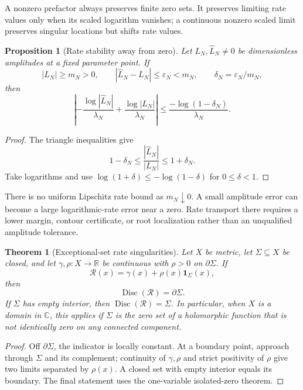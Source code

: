 \documentclass[11pt,a4paper]{article}
\theoremstyle{definition}
\theoremstyle{plain}
\newtheorem{proposition}[definition]{Proposition}
\newtheorem{theorem}[definition]{Theorem}
\theoremstyle{remark}
\begin{document}
A nonzero prefactor always preserves finite zero sets.  It preserves limiting
rate values only when its scaled logarithm vanishes; a continuous nonzero
scaled limit preserves singular locations but shifts rate values.

\begin{proposition}[Rate stability away from zero]\label{prop:ratestability}
Let \(L_N,\widehat L_N\ne0\) be dimensionless amplitudes at a fixed parameter
point.  If
\[
 |L_N|\geq m_N>0,\qquad
 |\widehat L_N-L_N|\leq\varepsilon_N<m_N,
 \qquad \delta_N=\varepsilon_N/m_N,
\]
then
\[
 \left|
 -\frac{\log|\widehat L_N|}{\lambda_N}
 +\frac{\log|L_N|}{\lambda_N}
 \right|
 \leq
 \frac{-\log(1-\delta_N)}{\lambda_N}.
\]
\end{proposition}
\begin{proof}
The triangle inequalities give
\[
 1-\delta_N
 \leq\frac{|\widehat L_N|}{|L_N|}
 \leq1+\delta_N.
\]
Take logarithms and use
\(\log(1+\delta)\leq-\log(1-\delta)\) for \(0\leq\delta<1\).
\end{proof}

There is no uniform Lipschitz rate bound as \(m_N\downarrow0\).  A small
amplitude error can become a large logarithmic-rate error near a zero.
Rate transport there requires a lower margin, contour certificate, or root
localization rather than an unqualified amplitude tolerance.

\begin{theorem}[Exceptional-set rate singularities]\label{thm:ratesupport}
Let \(X\) be metric, let \(\Sigma\subseteq X\) be closed, and let
\(\gamma,\rho:X\to\mathbb R\) be continuous with
\(\rho>0\) on \(\partial\Sigma\).  If
\[
 \mathcal R(x)=\gamma(x)+\rho(x)\mathbf1_\Sigma(x),
\]
then
\[
 \operatorname{Disc}(\mathcal R)=\partial\Sigma.
\]
If \(\Sigma\) has empty interior, then
\(\operatorname{Disc}(\mathcal R)=\Sigma\).  In particular, when \(X\) is a
domain in \(\mathbb C\), this applies if \(\Sigma\) is the zero set of a
holomorphic function that is not identically zero on any connected component.
\end{theorem}
\begin{proof}
Off \(\partial\Sigma\), the indicator is locally constant.  At a boundary
point, approach through \(\Sigma\) and its complement; continuity of
\(\gamma,\rho\) and strict positivity of \(\rho\) give two limits separated
by \(\rho(x)\).  A closed set with empty interior equals its boundary.  The
final statement uses the one-variable isolated-zero theorem.
\end{proof}
\end{document}

